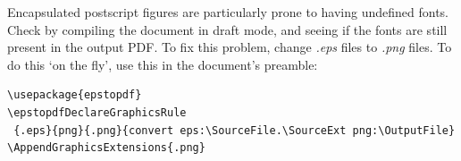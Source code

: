 Encapsulated postscript figures are particularly prone to having undefined fonts. Check by compiling the document in draft mode, and seeing if the fonts are still present in the output PDF. To fix this problem, change \emph{.eps} files to \emph{.png} files. To do this `on the fly', use this in the document's preamble:

\begin{lstlisting}
\usepackage{epstopdf}
\epstopdfDeclareGraphicsRule
 {.eps}{png}{.png}{convert eps:\SourceFile.\SourceExt png:\OutputFile}
\AppendGraphicsExtensions{.png}
\end{lstlisting}